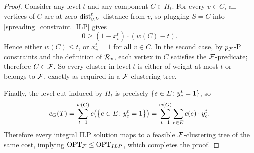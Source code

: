 \begin{proof}
        Consider any level $t$ and any component $C\in \Pi_t$. For every $v\in C$, all vertices of $C$ are at zero $\text{dist}_{y,V}^t$-distance from $v$, so plugging $S=C$ into \eqref{spreading_constraint_ILP} gives
        \[
            0\ge (1-x_v^t)\cdot (w(C)-t).
        \]
        Hence either $w(C)\le t$, or $x_v^t=1$ for all $v\in C$. In the second case, by $p_{\mathcal{F}}$-P constraints and the definition of $\mathcal{R}_v$, each vertex in $C$ satisfies the $\mathcal{F}$-predicate; therefore $C\in \mathcal{F}$. So every cluster in level $t$ is either of weight at most $t$ or belongs to $\mathcal{F}$, exactly as required in a $\mathcal{F}$-clustering tree.

        Finally, the level cut induced by $\Pi_t$ is precisely $\mathopen{}\left\{ e\in E\colon y_e^t=1 \right\}$, so
        \[
            {c}_G(T)=\sum_{t=1}^{w\mathopen{}\left( G \right)} c\mathopen{}\left( \mathopen{}\left\{ e\in E\colon y_e^t=1 \right\} \right)
            =\sum_{t=1}^{w\mathopen{}\left( G \right)}\sum_{e\in E} c(e)\cdot y_e^t.
        \]
        Therefore every integral ILP solution maps to a feasible $\mathcal{F}$-clustering tree of the same cost, implying $\text{OPT}_{\mathcal{F}}\le \text{OPT}_{ILP}$, which completes the proof.
    \end{proof}

